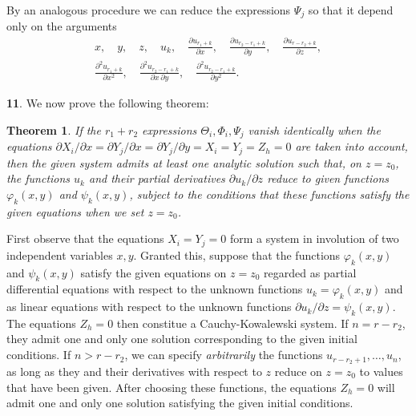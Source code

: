 \documentclass[leqno,11pt]{article}
\newcommand{\pd}{\partial}
\theoremstyle{shape1}
\newtheorem*{thm*}{\hspace{15pt}Theorem}
\theoremstyle{shape0}
\theoremstyle{shape2}
\theoremstyle{definition}
\begin{document}
By an analogous procedure we can reduce the expressions $\Psi_{j}$ so that it depend only on the arguments
\begin{gather*}
  x,\quad y,\quad z,\quad u_{k},\quad \frac{\pd u_{r_{1}+k}}{\pd x},\quad\frac{\pd u_{r_{2}-r_{1}+k}}{\pd y},\quad\frac{\pd u_{r-r_{2}+k}}{\pd z},\\
  \frac{\pd ^{2}u_{r_{1}+k}}{\pd x^{2}},\quad\frac{\pd^{2}u_{r_{2}-r_{1}+k}}{\pd x\,\pd y},\quad\frac{\pd ^{2}u_{r_{2}-r_{1}+k}}{\pd y^{2}}.
\end{gather*}

\vspace{12pt}

\textbf{11}. We now prove the following theorem:

\begin{thm*}
  If the $r_{1}+r_{2}$ expressions $\Theta_{i},\Phi_{i},\Psi_{j}$ vanish identically when the equations $\pd X_{i}/\pd x=\pd Y_{j}/\pd x=\pd Y_{j}/\pd y=X_{i}=Y_{j}=Z_{h}=0$ are taken into account, then the given system admits at least one analytic solution such that, on $z=z_{0}$, the functions $u_{k}$ and their partial derivatives $\pd u_{k}/\pd z$ reduce to given functions $\varphi_{k}(x,y)$ and $\psi_{k}(x,y)$, subject to the conditions that these functions satisfy the given equations when we set $z=z_{0}$.
\end{thm*}

First observe that the equations $X_{i}=Y_{j}=0$ form a system in involution of two independent variables $x,y$. Granted this, suppose that the functions $\varphi_{k}(x,y)$ and $\psi_{k}(x,y)$ satisfy the given equations on $z=z_{0}$ regarded as partial differential equations with respect to the unknown functions $u_{k}=\varphi_{k}(x,y)$ and as linear equations with respect to the unknown functions $\pd u_{k}/\pd z=\psi_{k}(x,y)$. The equations $Z_{h}=0$ then constitue a Cauchy-Kowalewski system. If $n=r-r_{2}$, they admit one and only one solution corresponding to the given initial conditions. If $n>r-r_{2}$, we can specify \emph{arbitrarily} the functions $u_{r-r_{2}+1},\dots,u_{n}$, as long as they and their derivatives with respect to $z$ reduce on $z=z_{0}$ to values that have been given. After choosing these functions, the equations $Z_{h}=0$ will admit one and only one solution satisfying the given initial conditions.
\end{document}
